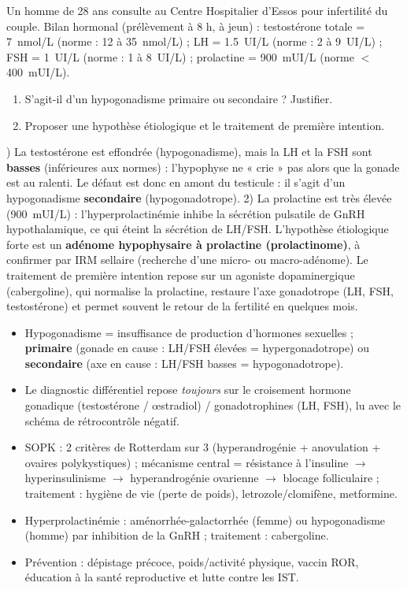 \documentclass[11pt]{article}
\begin{document}
\begin{exoresolu}
Un homme de 28 ans consulte au Centre Hospitalier d'Essos pour infertilité du couple. Bilan hormonal (prélèvement à 8 h, à jeun) : testostérone totale = \SI{7}{nmol/L} (norme : \num{12} à \SI{35}{nmol/L}) ; LH = \SI{1,5}{UI/L} (norme : \num{2} à \SI{9}{UI/L}) ; FSH = \SI{1}{UI/L} (norme : \num{1} à \SI{8}{UI/L}) ; prolactine = \SI{900}{mUI/L} (norme $<$ \SI{400}{mUI/L}).
\begin{enumerate}
\item S'agit-il d'un hypogonadisme primaire ou secondaire ? Justifier.
\item Proposer une hypothèse étiologique et le traitement de première intention.
\end{enumerate}
) La testostérone est effondrée (hypogonadisme), mais la LH et la FSH sont \textbf{basses} (inférieures aux normes) : l'hypophyse ne « crie » pas alors que la gonade est au ralenti. Le défaut est donc en amont du testicule : il s'agit d'un hypogonadisme \textbf{secondaire} (hypogonadotrope). 2) La prolactine est très élevée (\SI{900}{mUI/L}) : l'hyperprolactinémie inhibe la sécrétion pulsatile de GnRH hypothalamique, ce qui éteint la sécrétion de LH/FSH. L'hypothèse étiologique forte est un \textbf{adénome hypophysaire à prolactine (prolactinome)}, à confirmer par IRM sellaire (recherche d'une micro- ou macro-adénome). Le traitement de première intention repose sur un agoniste dopaminergique (cabergoline), qui normalise la prolactine, restaure l'axe gonadotrope (LH, FSH, testostérone) et permet souvent le retour de la fertilité en quelques mois.
\end{exoresolu}

\begin{aretenir}
\begin{itemize}
\item Hypogonadisme = insuffisance de production d'hormones sexuelles ; \textbf{primaire} (gonade en cause : LH/FSH élevées = hypergonadotrope) ou \textbf{secondaire} (axe en cause : LH/FSH basses = hypogonadotrope).
\item Le diagnostic différentiel repose \emph{toujours} sur le croisement hormone gonadique (testostérone / œstradiol) / gonadotrophines (LH, FSH), lu avec le schéma de rétrocontrôle négatif.
\item SOPK : 2 critères de Rotterdam sur 3 (hyperandrogénie + anovulation + ovaires polykystiques) ; mécanisme central = résistance à l'insuline $\rightarrow$ hyperinsulinisme $\rightarrow$ hyperandrogénie ovarienne $\rightarrow$ blocage folliculaire ; traitement : hygiène de vie (perte de poids), letrozole/clomifène, metformine.
\item Hyperprolactinémie : aménorrhée-galactorrhée (femme) ou hypogonadisme (homme) par inhibition de la GnRH ; traitement : cabergoline.
\item Prévention : dépistage précoce, poids/activité physique, vaccin ROR, éducation à la santé reproductive et lutte contre les IST.
\end{itemize}
\end{aretenir}
\end{document}
